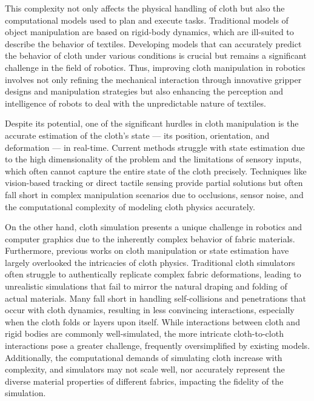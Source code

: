 \documentclass[subscriptcorrection,upint,varvw,barcolor=Goldenrod3,mathalfa=cal=euler,balance,hyphenate,french,pdf-a, nofoot]{asmejour} %
\begin{document}
This complexity not only affects the physical handling of cloth but also the computational models used to plan and execute tasks. Traditional models of object manipulation are based on rigid-body dynamics, which are ill-suited to describe the behavior of textiles\cite{zheng2024differentiable}. Developing models that can accurately predict the behavior of cloth under various conditions is crucial but remains a significant challenge in the field of robotics. Thus, improving cloth manipulation in robotics involves not only refining the mechanical interaction through innovative gripper designs and manipulation strategies but also enhancing the perception and intelligence of robots to deal with the unpredictable nature of textiles.

Despite its potential, one of the significant hurdles in cloth manipulation is the accurate estimation of the cloth's state — its position, orientation, and deformation — in real-time. Current methods struggle with state estimation due to the high dimensionality of the problem and the limitations of sensory inputs, which often cannot capture the entire state of the cloth precisely. Techniques like vision-based tracking or direct tactile sensing provide partial solutions but often fall short in complex manipulation scenarios due to occlusions, sensor noise, and the computational complexity of modeling cloth physics accurately.

On the other hand, cloth simulation presents a unique challenge in robotics and computer graphics due to the inherently complex behavior of fabric materials. Furthermore, previous works on cloth manipulation or state estimation have largely overlooked the intricacies of cloth physics\cite{clegg2018learning, chen2022efficiently, bertiche2022neural, santesteban2019learning, lahner2018deepwrinkles}. Traditional cloth simulators often struggle to authentically replicate complex fabric deformations, leading to unrealistic simulations that fail to mirror the natural draping and folding of actual materials. Many fall short in handling self-collisions and penetrations that occur with cloth dynamics, resulting in less convincing interactions, especially when the cloth folds or layers upon itself. While interactions between cloth and rigid bodies are commonly well-simulated, the more intricate cloth-to-cloth interactions pose a greater challenge, frequently oversimplified by existing models. Additionally, the computational demands of simulating cloth increase with complexity, and simulators may not scale well, nor accurately represent the diverse material properties of different fabrics, impacting the fidelity of the simulation.
\end{document}

